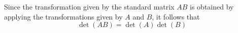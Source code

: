 \begin{applicationActivities}
\begin{activity}{5}
\end{activity}

\begin{fact}
Since the transformation given by the standard matrix \(AB\) is obtained
by applying the transformations given by \(A\) and \(B\), it follows that \[\det(AB)=\det(A)\det(B)\]
%
%
\end{fact}


\end{applicationActivities}
